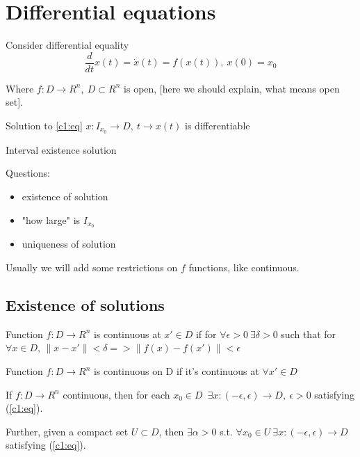 \section{Differential equations}

Consider differential equality
\begin{equation}\label{c1:eq}
\frac{d}{dt}x(t)=\dot x(t)=f(x(t)), \ x(0)=x_0 
\end{equation}

Where $f:D\rightarrow R^n, \ D\subset R^n$ is open, [here we should explain,
what means open set].

Solution to \ref{c1:eq} $x:I_{x_0} \rightarrow D, \ t\rightarrow x(t)$ is
differentiable

Interval existence solution

Questions:

\begin{itemize}[label=$\#$]
\item existence of solution
\item "how large" is $I_{x_0}$
\item uniqueness of solution
\end{itemize}



Usually we will add some restrictions on $f$ functions, like continuous.

\subsection{Existence of solutions}

\begin{Definition}
Function $f:D \rightarrow R^n$ is continuous at $x' \in D$ if for
$\forall \epsilon > 0 \ \exists \delta>0$ such that for $\forall x \in D$,
$\|x-x'\|<\delta => \|f(x)-f(x')\| < \epsilon$

Function $f:D \rightarrow R^n$ is continuous on D if it's 
continuous at $\forall x' \in D$
\end{Definition}

\begin{Theorem}[Piano]
If $f:D \rightarrow R^n$ continuous, then for each $x_0 \in D$\ 
$\exists x:(-\epsilon,\epsilon) \rightarrow D, \ \epsilon > 0$
satisfying (\ref{c1:eq}).
\end{Theorem}

Further, given a compact set $U \subset D$, then 
$\exists \alpha > 0$ s.t. $\forall x_0 \in U 
\ \exists x:(-\epsilon,\epsilon) \rightarrow D$ satisfying (\ref{c1:eq}).


